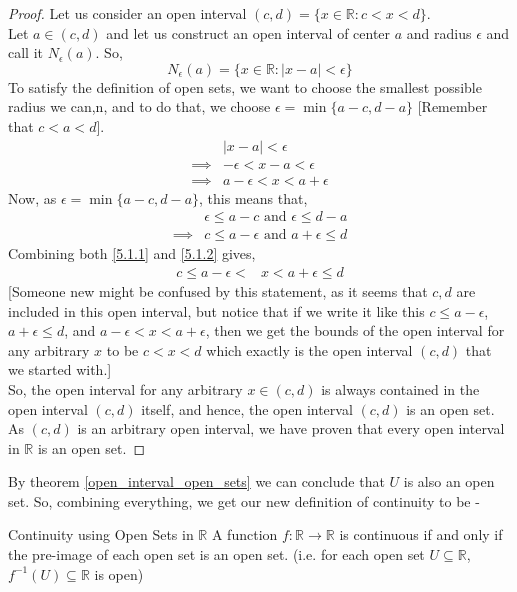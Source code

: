 \begin{proof}
    Let us consider an open interval $(c,d)=\{x\in\mathbb{R}:c<x<d\}$.\\
    Let $a\in(c,d)$ and let us construct an open interval of center $a$ and radius $\epsilon$ and call it $N_{\epsilon}(a)$. So,
    $$N_{\epsilon}(a)=\{x\in\mathbb{R}:|x-a|<\epsilon\}$$
    To satisfy the definition of open sets, we want to choose the smallest possible radius we can,n, and to do that, we choose $\epsilon=\min\{a-c,d-a\}$ [Remember that $c<a<d$].
    \begin{align}\label{5.1.1}
        & |x-a|<\epsilon\nonumber\\
        \implies & -\epsilon<x-a<\epsilon\nonumber\\
        \implies & \boxed{a-\epsilon<x<a+\epsilon}
    \end{align}
    Now, as $\epsilon=\min\{a-c,d-a\}$, this means that,
    \begin{align}\label{5.1.2}
        & \epsilon\leq a-c\text{ and }\epsilon\leq d-a\nonumber\\
        \implies & \boxed{c\leq a-\epsilon\text{ and }a+\epsilon\leq d}
    \end{align}
    Combining both \eqref{5.1.1} and \eqref{5.1.2} gives,
    \begin{align*}
        c\leq a-\epsilon<&x<a+\epsilon\leq d
    \end{align*}
    [Someone new might be confused by this statement, as it seems that $c,d$ are included in this open interval, but notice that if we write it like this $c\leq a-\epsilon$, $a+\epsilon\leq d$, and $a-\epsilon<x<a+\epsilon$, then we get the bounds of the open interval for any arbitrary $x$ to be $c<x<d$ which exactly is the open interval $(c,d)$ that we started with.]\\
    So, the open interval for any arbitrary $x\in(c,d)$ is always contained in the open interval $(c,d)$ itself, and hence, the open interval $(c,d)$ is an open set. As $(c,d)$ is an arbitrary open interval, we have proven that every open interval in $\mathbb{R}$ is an open set.
\end{proof}
\noindent By theorem \eqref{open_interval_open_sets} we can conclude that $U$ is also an open set. So, combining everything, we get our new definition of continuity to be -
\begin{Theorem}{Continuity using Open Sets in \(\mathbb{R}\)}\label{con_open_sets_in_R}
    A function $f:\mathbb{R}\rightarrow\mathbb{R}$ is continuous if and only if the pre-image of each open set is an open set\footnotemark. (i.e. for each open set $U\subseteq \mathbb{R}$, $f^{-1}(U)\subseteq\mathbb{R}$ is open)
\end{Theorem}
